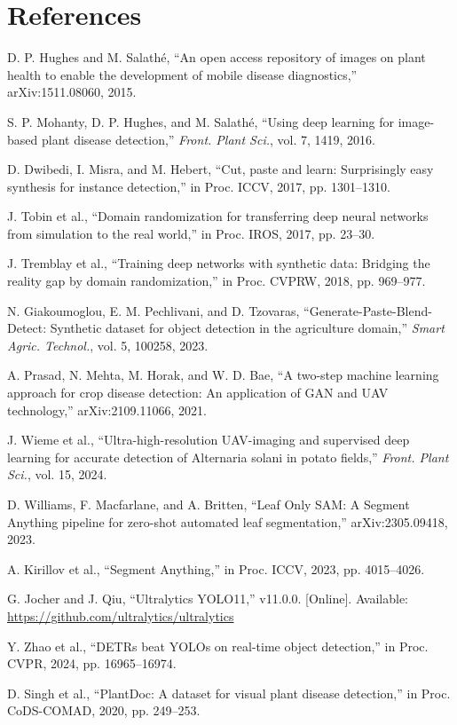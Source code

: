 \documentclass[12pt,a4paper]{report}
\theoremstyle{definition}
\theoremstyle{remark}
\begin{document}
\section*{References}
\begin{enumerate}[label={[\arabic*]}]
\item D. P. Hughes and M. Salathé, ``An open access repository of images on plant health to enable the development of mobile disease diagnostics,'' arXiv:1511.08060, 2015.
\item S. P. Mohanty, D. P. Hughes, and M. Salathé, ``Using deep learning for image-based plant disease detection,'' \textit{Front. Plant Sci.}, vol. 7, 1419, 2016.
\item D. Dwibedi, I. Misra, and M. Hebert, ``Cut, paste and learn: Surprisingly easy synthesis for instance detection,'' in Proc. ICCV, 2017, pp. 1301--1310.
\item J. Tobin et al., ``Domain randomization for transferring deep neural networks from simulation to the real world,'' in Proc. IROS, 2017, pp. 23--30.
\item J. Tremblay et al., ``Training deep networks with synthetic data: Bridging the reality gap by domain randomization,'' in Proc. CVPRW, 2018, pp. 969--977.
\item N. Giakoumoglou, E. M. Pechlivani, and D. Tzovaras, ``Generate-Paste-Blend-Detect: Synthetic dataset for object detection in the agriculture domain,'' \textit{Smart Agric. Technol.}, vol. 5, 100258, 2023.
\item A. Prasad, N. Mehta, M. Horak, and W. D. Bae, ``A two-step machine learning approach for crop disease detection: An application of GAN and UAV technology,'' arXiv:2109.11066, 2021.
\item J. Wieme et al., ``Ultra-high-resolution UAV-imaging and supervised deep learning for accurate detection of Alternaria solani in potato fields,'' \textit{Front. Plant Sci.}, vol. 15, 2024.
\item D. Williams, F. Macfarlane, and A. Britten, ``Leaf Only SAM: A Segment Anything pipeline for zero-shot automated leaf segmentation,'' arXiv:2305.09418, 2023.
\item A. Kirillov et al., ``Segment Anything,'' in Proc. ICCV, 2023, pp. 4015--4026.
\item G. Jocher and J. Qiu, ``Ultralytics YOLO11,'' v11.0.0. [Online]. Available: \url{https://github.com/ultralytics/ultralytics}
\item Y. Zhao et al., ``DETRs beat YOLOs on real-time object detection,'' in Proc. CVPR, 2024, pp. 16965--16974.
\item D. Singh et al., ``PlantDoc: A dataset for visual plant disease detection,'' in Proc. CoDS-COMAD, 2020, pp. 249--253.
\end{enumerate}
\end{document}
